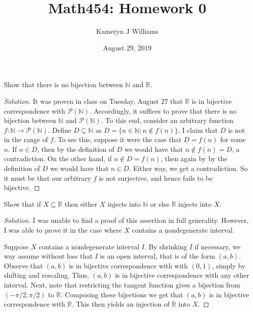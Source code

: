 \documentclass{amsart}
\title{Math454: Homework 0}
\author{Kameryn J Williams}
\date{August 29, 2019}
\theoremstyle{plain}
\newenvironment{solution}{\begin{proof}[Solution]}{\end{proof}}
\newcommand\Nbb{\mathbb{N}}
\newcommand\Rbb{\mathbb{R}}
\newcommand\powerset{\mathcal{P}}
\begin{document}
\maketitle

\begin{exercise}
Show that there is no bijection between $\Nbb$ and $\Rbb$.
\end{exercise}

\begin{solution}
It was proven in class on Tuesday, August 27 that $\Rbb$ is in bijective correspondence with $\powerset(\Nbb)$. Accordingly, it suffices to prove that there is no bijection between $\Nbb$ and $\powerset(\Nbb)$. To this end, consider an arbitrary function $f \colon \Nbb \to \powerset(\Nbb)$. Define $D \subseteq \Nbb$ as $D = \{ n \in \Nbb : n \not \in f(n) \}$. I claim that $D$ is not in the range of $f$. To see this, suppose it were the case that $D = f(n)$ for some $n$. If $n \in D$, then by the definition of $D$ we would have that $n \not \in f(n) = D$, a contradiction. On the other hand, if $n \not \in D = f(n)$, then again by by the definition of $D$ we would have that $n \in D$. Either way, we get a contradiction. So it must be that our arbitrary $f$ is not surjective, and hence fails to be bijective.
\end{solution}

\begin{exercise}
Show that if $X \subseteq \Rbb$ then either $X$ injects into $\Nbb$ or else $\Rbb$ injects into $X$.
\end{exercise}

\begin{solution}
I was unable to find a proof of this assertion in full generality. However, I was able to prove it in the case where $X$ contains a nondegenerate interval. 

Suppose $X$ contains a nondegenerate interval $I$. By shrinking $I$ if necessary, we way assume without loss that $I$ is an open interval, that is of the form $(a,b)$. Observe that $(a,b)$ is in bijective correspondence with with $(0,1)$, simply by shifting and rescaling. Thus, $(a,b)$ is in bijective correspondence with any other interval. Next, note that restricting the tangent function gives a bijection from $(-\pi/2, \pi/2)$ to $\Rbb$. Composing these bijections we get that $(a,b)$ is in bijective correspondence with $\Rbb$. This then yields an injection of $\Rbb$ into $X$. 
\end{solution}
\end{document}

